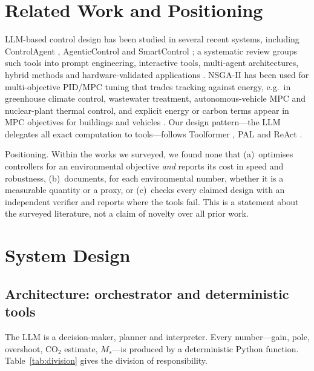 \documentclass[a4paper,11pt]{article}
\begin{document}
\section{Related Work and Positioning}
LLM-based control design has been studied in several recent systems, including ControlAgent \cite{controlagent}, AgenticControl \cite{agenticcontrol} and SmartControl \cite{smartcontrol}; a systematic review groups such tools into prompt engineering, interactive tools, multi-agent architectures, hybrid methods and hardware-validated applications \cite{llmpid}. NSGA-II \cite{nsga2} has been used for multi-objective PID/MPC tuning that trades tracking against energy, e.g.\ in greenhouse climate control, wastewater treatment, autonomous-vehicle MPC and nuclear-plant thermal control, and explicit energy or carbon terms appear in MPC objectives for buildings and vehicles \cite{hvacmpc,hevmpc,greenilc}. Our design pattern---the LLM delegates all exact computation to tools---follows Toolformer \cite{toolformer}, PAL \cite{pal} and ReAct \cite{react}.

Positioning. Within the works we surveyed, we found none that (a)~optimises controllers for an environmental objective \emph{and} reports its cost in speed and robustness, (b)~documents, for each environmental number, whether it is a measurable quantity or a proxy, or (c)~checks every claimed design with an independent verifier and reports where the tools fail. This is a statement about the surveyed literature, not a claim of novelty over all prior work.

\section{System Design}
\subsection{Architecture: orchestrator and deterministic tools}
The LLM is a decision-maker, planner and interpreter. Every number---gain, pole, overshoot, CO$_2$ estimate, $M_s$---is produced by a deterministic Python function. Table~\ref{tab:division} gives the division of responsibility.
\end{document}
